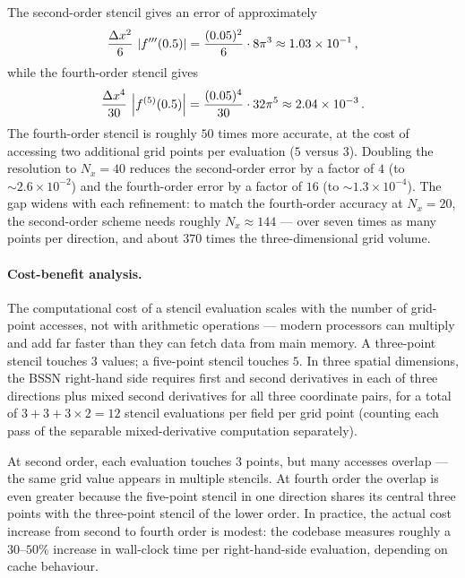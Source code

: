 The second-order stencil gives an error of approximately
%
\begin{equation}
  \frac{\Delta x^2}{6}\,\left\lvert f'''(0.5) \right\rvert
  = \frac{(0.05)^2}{6} \cdot 8\pi^3
  \approx 1.03 \times 10^{-1} \,,
  \label{eq:d1-error-second-order}
\end{equation}
%
while the fourth-order stencil gives
%
\begin{equation}
  \frac{\Delta x^4}{30}\,\left\lvert f^{(5)}(0.5) \right\rvert
  = \frac{(0.05)^4}{30} \cdot 32\pi^5
  \approx 2.04 \times 10^{-3} \,.
  \label{eq:d1-error-fourth-order}
\end{equation}
%
The fourth-order stencil is roughly $50$ times more accurate, at the cost
of accessing two additional grid points per evaluation ($5$ versus $3$).
Doubling the resolution to $N_x = 40$ reduces the second-order error by a
factor of $4$ (to $\sim 2.6 \times 10^{-2}$) and the fourth-order error by
a factor of $16$ (to $\sim 1.3 \times 10^{-4}$).  The gap widens with each
refinement: to match the fourth-order accuracy at $N_x = 20$, the
second-order scheme needs roughly $N_x \approx 144$ --- over seven times as
many points per direction, and about $370$ times the three-dimensional grid
volume.

\paragraph{Cost-benefit analysis.}

The computational cost of a stencil evaluation scales with the number of
grid-point accesses, not with arithmetic operations --- modern processors
can multiply and add far faster than they can fetch data from main memory.
A three-point stencil touches $3$ values; a five-point stencil touches $5$.
In three spatial dimensions, the BSSN right-hand side requires first and
second derivatives in each of three directions plus mixed second derivatives
for all three coordinate pairs, for a total of $3 + 3 + 3 \times 2 = 12$
stencil evaluations per field per grid point (counting each pass of the
separable mixed-derivative computation separately).

At second order, each evaluation touches $3$ points, but many accesses
overlap --- the same grid value appears in multiple stencils.  At fourth
order the overlap is even greater because the five-point stencil in one
direction shares its central three points with the three-point stencil of
the lower order.  In practice, the actual cost increase from second to
fourth order is modest: the codebase measures roughly a $30$--$50\%$
increase in wall-clock time per right-hand-side evaluation, depending on
cache behaviour.

